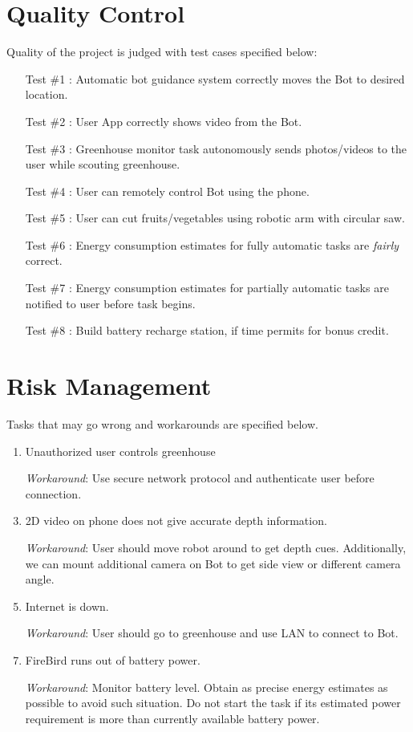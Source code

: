 \documentclass[a4paper, 12pt]{article}
\begin{document}
\section{Quality Control}
Quality of the project is judged with test cases specified below:
\begin{enumerate}
 \item[Test \#1]: Automatic bot guidance system correctly moves the Bot to desired location.
 \item[Test \#2]: User App correctly shows video from the Bot.
 \item[Test \#3]: Greenhouse monitor task autonomously sends photos/videos to the user while scouting greenhouse.
 \item[Test \#4]: User can remotely control Bot using the phone.
 \item[Test \#5]: User can cut fruits/vegetables using robotic arm with circular saw.
 \item[Test \#6]: Energy consumption estimates for fully automatic tasks are \emph{fairly} correct.
 \item[Test \#7]: Energy consumption estimates for partially automatic tasks are notified to user before task begins.
 \item[Test \#8]: Build battery recharge station, if time permits for bonus credit.
 \end{enumerate}

\section{Risk Management}
Tasks that may go wrong and workarounds are specified below.
\begin{enumerate}
 \item Unauthorized user controls greenhouse
 \item[] \emph{Workaround}: Use secure network protocol and authenticate user before connection.
 \item 2D video on phone does not give accurate depth information.
 \item[] \emph{Workaround}: User should move robot around to get depth cues. Additionally, we can mount additional camera on
 Bot to get side view or different camera angle. 
 \item Internet is down.
 \item[] \emph{Workaround}: User should go to greenhouse and use LAN to connect to Bot.
 \item FireBird runs out of battery power.
 \item[] \emph{Workaround}: Monitor battery level. Obtain as precise energy estimates as possible to avoid such situation.
 Do not start the task if its estimated power requirement is more than currently available battery power.
\end{enumerate}
\end{document}
